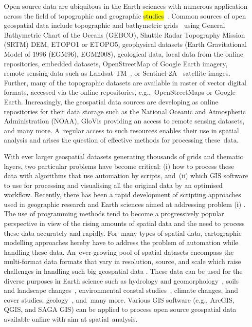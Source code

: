 \documentclass[technologies,article,accept,pdftex,moreauthors]{Definitions/mdpi}
\begin{document}
Open source data are ubiquitous in the Earth sciences with numerous application across the field of topographic and geographic \hl{studies}~\cite{WAGEMANN2021104916}. Common sources of open geospatial data include topographic and bathymetric grids~\cite{Basith,Habib} using General Bathymetric Chart of the Oceans (GEBCO), Shuttle Radar Topography Mission (SRTM) DEM, ETOPO1 or ETOPO5, geophysical datasets (Earth Gravitational Model of 1996 (EGM96), EGM2008){, }geological data{, }local data from the online repositories, embedded datasets, OpenStreetMap of Google Earth imagery, remote sensing data such as Landsat TM~\cite{YIN2021102457}, or Sentinel-2A~\cite{app13042525} satellite images. {Further,} many of the topographic datasets are available in raster of vector digital formats, accessed via {the }online repositories, e.g.,~OpenStreetMaps or Google Earth. Increasingly, {the }geospatial data sources are developing {as }online repositories for their data storage such as the National Oceanic and Atmospheric Administration (NOAA), GloVis providing an access to remote sensing datasets, {and many more}. A~regular access to such resources enables their use in spatial analysis and arises the question of effective methods for processing these~data.

{With ever larger geospatial datasets generating thousands of grids and thematic layers, two particular problems have become critical: (i) how to process these data with algorithms that use automation by scripts, and~(ii) which GIS software to use for processing and visualising all the original data by an optimised workflow. Recently, there has been a rapid development of }scripting approaches{ }used in geographic research and Earth sciences {aimed at addressing problem (i)} \cite{Rey}. {The use of programming methods }tend to become a progressively popular  perspective in view of the rising amounts of spatial data and the need to process these data accurately {and} rapidly. For~many types of spatial data, cartographic modelling approaches hereby have to address the problem of automation while handling these data. An~ever-growing pool of spatial datasets encompass the multi-format data formats that vary in resolution, source, and scale {which raise challenges in handling such big geospatial data} \cite{ZHANG2019101374,KIM2023100368}. These data can be used for the diverse purposes in Earth science such as hydrology and geomorphology~\cite{Teixeira}, soils and landscape changes~\cite{Savulescu}, environmental coastal studies~\cite{Hernandez}, climate changes, land cover studies, geology~\cite{app7090956}, and~many more. Various GIS software {(e.g., ArcGIS, QGIS, and SAGA GIS)} can be applied to process open source geospatial data available online with aim at spatial~analysis. 
\end{document}
